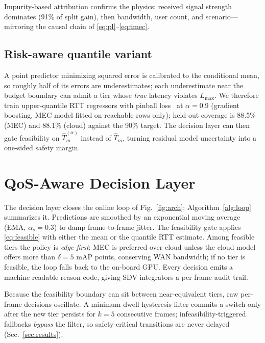 \documentclass[10pt,conference]{IEEEtran}
\newcommand{\lmax}{L_{\max}}
\begin{document}
Impurity-based attribution confirms the physics: received signal
strength dominates (91\% of split gain), then bandwidth, user count,
and scenario---mirroring the causal chain of
\eqref{eq:pl}--\eqref{eq:tmec}.

\subsection{Risk-aware quantile variant}

A point predictor minimizing squared error is calibrated to the
conditional mean, so roughly half of its errors are underestimates; each
underestimate near the budget boundary can admit a tier whose \emph{true}
latency violates $\lmax$.  We therefore train upper-quantile RTT
regressors with pinball loss~\cite{koenker1978} at $\alpha = 0.9$
(gradient boosting, MEC model fitted on reachable rows only); held-out
coverage is 88.5\% (MEC) and 88.1\% (cloud) against the 90\% target.  The
decision layer can then gate feasibility on $\hat T^{(\alpha)}_m$
instead of $\hat T_m$, turning residual model uncertainty into a
one-sided safety margin.

\section{QoS-Aware Decision Layer}\label{sec:policy}

The decision layer closes the online loop of Fig.~\ref{fig:arch};
Algorithm~\ref{alg:loop} summarizes it.  Predictions are
smoothed by an exponential moving average (EMA, $\alpha_s = 0.3$) to damp
frame-to-frame jitter.  The feasibility gate applies
\eqref{eq:feasible} with either the mean or the quantile RTT estimate.
Among feasible tiers the policy is \emph{edge-first}: MEC is preferred
over cloud unless the cloud model offers more than $\delta = 5$ mAP
points, conserving WAN bandwidth; if no tier is feasible, the loop
falls back to the on-board GPU.  Every decision emits a
machine-readable reason code, giving SDV integrators a per-frame audit
trail.

Because the feasibility boundary can sit between near-equivalent tiers,
raw per-frame decisions oscillate.  A minimum-dwell hysteresis filter
commits a switch only after the new tier persists for $k=5$ consecutive
frames; infeasibility-triggered fallbacks \emph{bypass} the filter, so
safety-critical transitions are never delayed
(Sec.~\ref{sec:results}).
\end{document}
